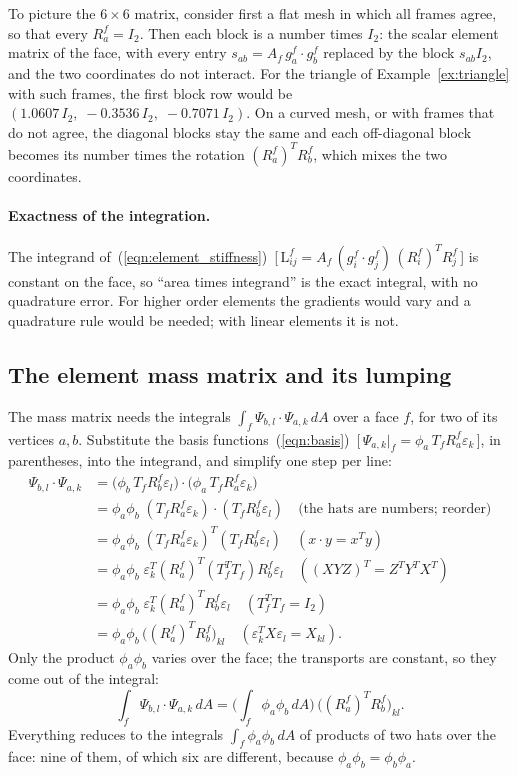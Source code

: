 To picture the $6\times 6$ matrix, consider first a flat mesh in which all frames agree, so that every $R_a^f = I_2$. Then each block is a number times $I_2$: the scalar element matrix of the face, with every entry $s_{ab} = A_f\, g_a^f\cdot g_b^f$ replaced by the block $s_{ab} I_2$, and the two coordinates do not interact. For the triangle of Example~\ref{ex:triangle} with such frames, the first block row would be $(1.0607\, I_2,\; -0.3536\, I_2,\; -0.7071\, I_2)$. On a curved mesh, or with frames that do not agree, the diagonal blocks stay the same and each off-diagonal block becomes its number times the rotation $(R_a^f)^TR_b^f$, which mixes the two coordinates.

\paragraph{Exactness of the integration.} The integrand of~(\ref{eqn:element_stiffness})~[\,$\mathrm L^f_{ij} = A_f\,(g_i^f\cdot g_j^f)\,(R_i^f)^TR_j^f$\,] is constant on the face, so ``area times integrand'' is the exact integral, with no quadrature error. For higher order elements the gradients would vary and a quadrature rule would be needed; with linear elements it is not.

\subsection{The element mass matrix and its lumping}

The mass matrix needs the integrals $\int_f \Psi_{b,l} \cdot \Psi_{a,k}\, dA$ over a face $f$, for two of its vertices $a, b$. Substitute the basis functions~(\ref{eqn:basis})~[\,$\Psi_{a,k}|_f = \phi_a\,T_fR_a^f\varepsilon_k$\,], in parentheses, into the integrand, and simplify one step per line:
\begin{align*}
\Psi_{b,l} \cdot \Psi_{a,k} &= \big(\phi_b\, T_f R_b^f\varepsilon_l\big)\cdot\big(\phi_a\, T_f R_a^f\varepsilon_k\big) \\
&= \phi_a\phi_b\; (T_f R_a^f\varepsilon_k)\cdot (T_f R_b^f \varepsilon_l) \quad \text{(the hats are numbers; reorder)}\\
&= \phi_a\phi_b\; (T_f R_a^f\varepsilon_k)^T (T_f R_b^f \varepsilon_l) \quad (x\cdot y = x^Ty)\\
&= \phi_a\phi_b\; \varepsilon_k^T (R_a^f)^T (T_f^T T_f) R_b^f \varepsilon_l \quad ((XYZ)^T = Z^TY^TX^T)\\
&= \phi_a\phi_b\; \varepsilon_k^T (R_a^f)^T R_b^f \varepsilon_l \quad (T_f^T T_f = I_2)\\
&= \phi_a\phi_b\, \big( (R_a^f)^T R_b^f \big)_{kl} \quad (\varepsilon_k^TX\varepsilon_l = X_{kl}).
\end{align*}
Only the product $\phi_a\phi_b$ varies over the face; the transports are constant, so they come out of the integral:
\begin{equation*}
\int_f \Psi_{b,l} \cdot \Psi_{a,k}\, dA = \Big( \int_f \phi_a \phi_b\, dA \Big)\, \big( (R_a^f)^T R_b^f \big)_{kl} .
\end{equation*}
Everything reduces to the integrals $\int_f \phi_a\phi_b\, dA$ of products of two hats over the face: nine of them, of which six are different, because $\phi_a\phi_b = \phi_b\phi_a$.

